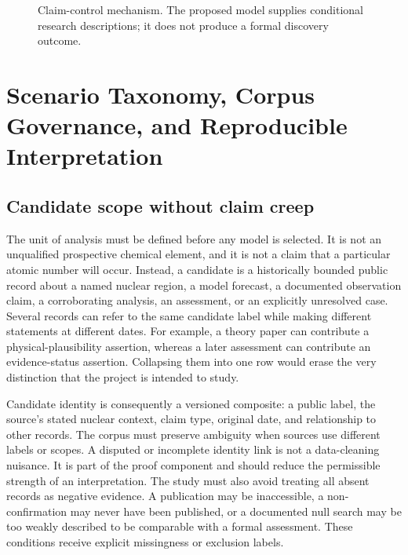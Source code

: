 \documentclass[conference]{IEEEtran}
\begin{document}
\begin{figure}[!t]
\centering
{}
\caption{Claim-control mechanism. The proposed model supplies conditional research descriptions; it does not produce a formal discovery outcome.}
\label{fig:states}
\end{figure}

\section{Scenario Taxonomy, Corpus Governance, and Reproducible Interpretation}

\subsection{Candidate scope without claim creep}

The unit of analysis must be defined before any model is selected. It is not an unqualified prospective chemical element, and it is not a claim that a particular atomic number will occur. Instead, a candidate is a historically bounded public record about a named nuclear region, a model forecast, a documented observation claim, a corroborating analysis, an assessment, or an explicitly unresolved case. Several records can refer to the same candidate label while making different statements at different dates. For example, a theory paper can contribute a physical-plausibility assertion, whereas a later assessment can contribute an evidence-status assertion. Collapsing them into one row would erase the very distinction that the project is intended to study.

Candidate identity is consequently a versioned composite: a public label, the source's stated nuclear context, claim type, original date, and relationship to other records. The corpus must preserve ambiguity when sources use different labels or scopes. A disputed or incomplete identity link is not a data-cleaning nuisance. It is part of the proof component and should reduce the permissible strength of an interpretation. The study must also avoid treating all absent records as negative evidence. A publication may be inaccessible, a non-confirmation may never have been published, or a documented null search may be too weakly described to be comparable with a formal assessment. These conditions receive explicit missingness or exclusion labels.
\end{document}
